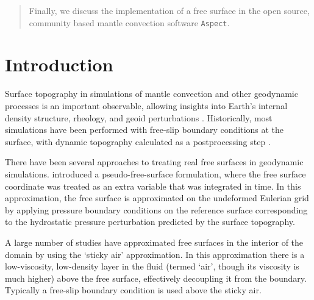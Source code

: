 \documentclass[preprint,12pt,authoryear]{elsarticle}
\begin{document}
\begin{frontmatter}
\begin{abstract}
Finally, we discuss the implementation of a free surface in the open source, community based
mantle convection software \texttt{Aspect}.
\end{abstract}

\begin{keyword}



\end{keyword}

\end{frontmatter}


\section{Introduction}
\label{sec:intro}

Surface topography in simulations of mantle convection and other geodynamic processes is an important observable,
allowing insights into Earth's internal density structure, rheology, and geoid perturbations \citep[e.g.][]{richards1984geoid, hager1985lower, baumann2014constraining}.
Historically, most simulations have been performed with free-slip boundary conditions at the surface, 
with dynamic topography calculated as a postprocessing step \citep[e.g.][]{zhong2000role}.

There have been several approaches to treating real free surfaces in geodynamic simulations.
\citet{zhong1996free} introduced a pseudo-free-surface formulation, where the free surface coordinate was
treated as an extra variable that was integrated in time. In this approximation, the free surface 
is approximated on the undeformed Eulerian grid by applying pressure boundary conditions on the reference surface 
corresponding to the hydrostatic pressure perturbation predicted by the surface topography.

A large number of studies have approximated free surfaces in the interior of the domain by using the 
`sticky air' approximation. In this approximation there is a low-viscosity, low-density layer in the fluid 
(termed `air', though its viscosity is much higher) above the free surface, effectively decoupling it from the boundary. 
Typically a free-slip boundary condition is used above the sticky air. 
\end{document}
